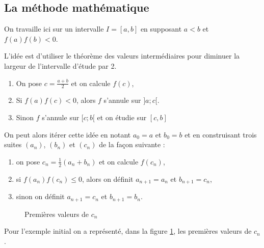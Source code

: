 \subsection{La méthode mathématique}
On travaille ici sur un intervalle $I=[a,b]$ en supposant $a<b$ et $f(a)f(b) <0 $.

L'idée est d'utiliser le théorème des valeurs intermédiaires pour diminuer la largeur de l'intervalle d'étude par 2.
\begin{enumerate}
\item On pose $c = \frac{a+b}{2}$ et on calcule $f(c)$,
\item Si $f(a) f(c) <0 $, alors $f$ s'annule sur $]a; c[$.
\item Sinon $f$ s'annule sur $[c; b[$ et on étudie sur $ [c,b]$
\end{enumerate}

On peut alors itérer cette idée en notant $a_{0}=a$ et $b_{0}=b$  et en construisant trois suites $(a_n)$, $(b_n)$ et $(c_n)$ de la façon suivante :
\begin{enumerate}
\item on pose $c_n = \frac 1{2}(a_n+b_n)$ et on calcule $f(c_n)$,
\item si $f(a_n) f(c_n) \le 0 $, alors on définit $a_{n+1} = a_n$ et $b_{n+1}=c_n$,
\item sinon on définit $a_{n+1} = c_n$ et $b_{n+1}=b_n$.
\end{enumerate}
\begin{figure}[ht]
  \begin{center}
  \caption{\label{grf:c0c1c2} Premières valeurs de $c_n$}
  \end{center}
\end{figure}
Pour l'exemple initial on a représenté, dans la figure \ref{grf:c0c1c2}, les premières valeurs de $c_n$.

